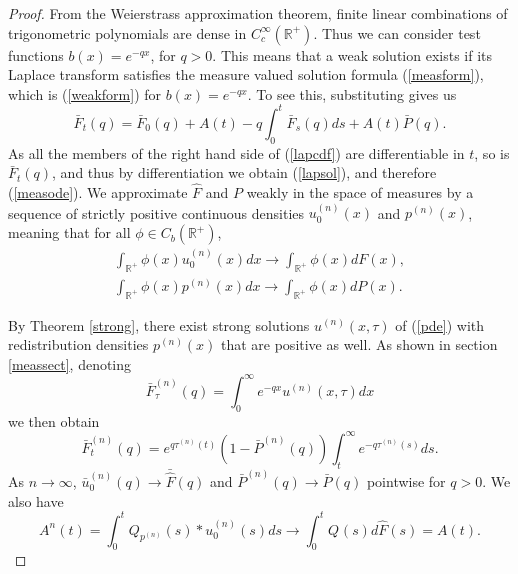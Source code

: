 \begin{proof}
From the Weierstrass approximation theorem, finite linear combinations of trigonometric polynomials are dense in $C_c^\infty(\mathbb{R}^+)$.  Thus we can consider test functions $b(x)= e^{-qx}$, for $q>0$.  This means that a weak solution exists if its Laplace transform satisfies the measure valued solution formula (\ref{measform}), which is (\ref{weakform}) for $b(x) = e^{-qx}$. To see this, substituting gives us
\begin{equation}
\bar F_t(q) = \bar F_0(q) + A(t) - q\int_0^t \bar F_s(q)ds +A(t)\bar P(q). \label{lapcdf}
\end{equation} 
As all the members of the right hand side of (\ref{lapcdf}) are differentiable in $t$, so is $\bar F_t(q)$, and thus by differentiation we obtain (\ref{lapsol}), and therefore (\ref{measode}).
 We approximate $\hat F$ and $P$ weakly in the space of measures by a sequence of strictly positive continuous densities $u^{(n)}_0(x)$ and $p^{(n)}(x)$, meaning that for all $\phi \in C_b(\mathbb{R}^+)$,
\begin{eqnarray}
\int_{\mathbb{R}^+} \phi (x)u^{(n)}_0(x)dx \rightarrow \int_{\mathbb{R}^+} \phi(x) dF(x),\\
\int_{\mathbb{R}^+} \phi(x) p^{(n)}(x)dx \rightarrow \int_{\mathbb{R}^+} \phi(x) dP(x).
\end{eqnarray}

 By Theorem \ref{strong}, there exist strong solutions $u^{(n)}(x,\tau)$ of (\ref{pde}) with redistribution densities $p^{(n)}(x)$ that are positive as well. As shown in section \ref{meassect}, denoting
\begin{equation}
\bar F_\tau^{(n)}(q) = \int_0^\infty e^{-qx} u^{(n)}(x,\tau)dx 
\end{equation}
we then obtain 
\begin{equation}\label{appsmooth}
 \bar F_t^{(n)}(q) = e^{q\tau^{(n)}(t)}(1-\bar P^{(n)}(q))\int_t^\infty e^{-q\tau ^{(n)}(s)}ds. 
\end{equation}
As $n \rightarrow \infty$, $\bar u^{(n)}_0(q) \rightarrow \bar{\hat F}(q)$ and $\bar P^{(n)}(q) \rightarrow {\bar P}(q)$ pointwise for $q >0$.  We also have 
\begin{equation} 
A^n(t) = \int_0^t Q_{p^{(n)}}(s)*u^{(n)}_0 (s)ds \rightarrow \int_0^tQ^{}(s)d\hat F(s) = A(t). 
\end{equation} 
  




\end{proof}
